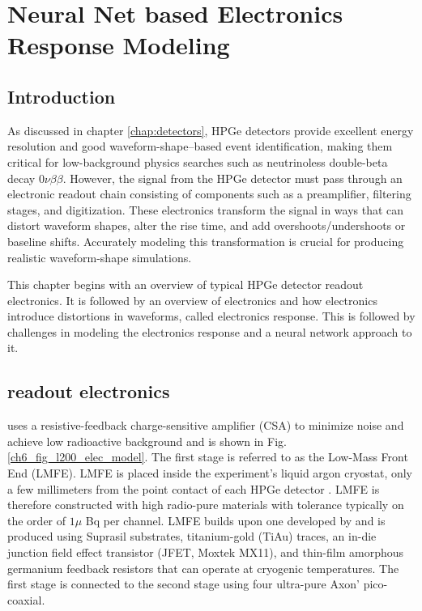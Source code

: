 \chapter{Neural Net based Electronics Response Modeling}
\label{chap:elect_resp}

\section{Introduction}
As discussed in chapter \ref{chap:detectors}, HPGe detectors provide excellent energy resolution and good waveform-shape–based event identification, making them critical for low-background physics searches such as neutrinoless double-beta decay $0\nu\beta\beta$. However, the signal from the HPGe detector must pass through an electronic readout chain consisting of components such as a preamplifier, filtering stages, and digitization. These electronics transform the signal in ways that can distort waveform shapes, alter the rise time, and add overshoots/undershoots or baseline shifts. Accurately modeling this transformation is crucial for producing realistic waveform-shape simulations.

This chapter begins with an overview of typical HPGe detector readout electronics. It is followed by an overview of {\Ltwo}  electronics and how electronics introduce distortions in waveforms, called electronics response. This is followed by challenges in modeling the electronics response and a neural network approach to it.

\section{{\Ltwo} readout electronics}

{\Ltwo} uses a resistive-feedback charge-sensitive amplifier (CSA) to minimize noise and achieve low radioactive background and is shown in Fig. \ref{ch6_fig_l200_elec_model}. The first stage is referred to as the Low-Mass Front End (LMFE). LMFE is placed inside the experiment’s liquid argon cryostat, only a few millimeters from the point contact of each HPGe detector \cite{Willers_2020}. LMFE is therefore constructed with high radio-pure materials with tolerance typically on the order of $1\mu$ Bq per channel. LMFE builds upon one developed by {\MJD} and is produced using Suprasil substrates, titanium-gold (TiAu) traces, an in-die junction field effect transistor (JFET, Moxtek MX11), and thin-film amorphous germanium feedback resistors that can operate at cryogenic temperatures. The first stage is connected to the second stage using four ultra-pure Axon’ pico-coaxial.

